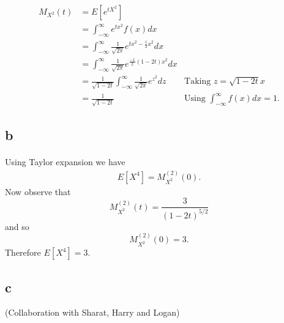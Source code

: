 \documentclass[letterpaper,12pt,oneside,onecolumn]{article}
\begin{document}
\paragraph{}
\begin{align*}
M_{X^2}(t) &= E[e^{tX^2}] \\
&= \int_{-\infty}^\infty e^{tx^2}f(x)dx \\
&=\int_{-\infty}^\infty \frac{1}{\sqrt{2\pi}}e^{tx^2-\frac{1}{2}x^2}dx \\
&= \int_{-\infty}^\infty \frac{1}{\sqrt{2\pi}}e^{\frac{-1}{2}(1-2t)x^2}dx \\
&= \frac{1}{\sqrt{1-2t}}\int_{-\infty}^\infty \frac{1}{\sqrt{2\pi}}e^{z^2}dz &\text{Taking $z=\sqrt{1-2t}x$} \\
&= \frac{1}{\sqrt{1-2t}} &\text{Using $\int_{-\infty}^\infty f(x)dx = 1$}.
\end{align*}
\subsection{b}
\paragraph{}
Using Taylor expansion we have
\begin{align*}
E[X^4] = M_{X^2}^{(2)}(0).
\end{align*}
Now observe that
$$M_{X^2}^{(2)}(t) = \frac{3}{(1-2t)^{5/2}}$$
and so
$$M_{X^2}^{(2)}(0) = 3.$$
Therefore $E[X^4] = 3$.
\subsection{c}
(Collaboration with Sharat, Harry and Logan)
\end{document}
